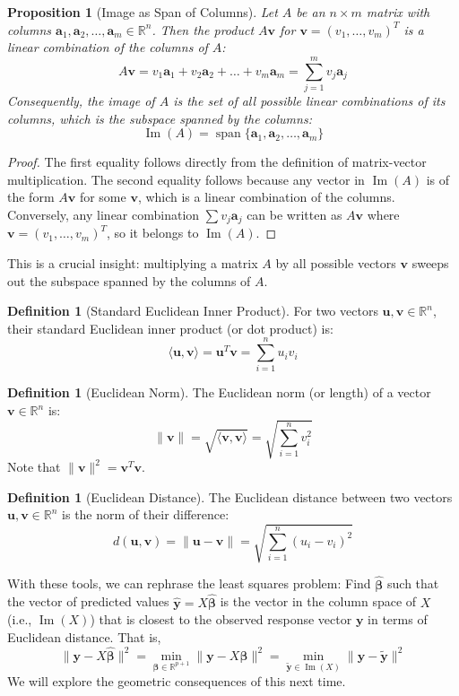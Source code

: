 \documentclass[11pt]{article}
\newtheorem{proposition}[theorem]{Proposition}
\theoremstyle{definition}
\newtheorem{definition}[theorem]{Definition}
\newcommand{\R}{\mathbb{R}}
\newcommand{\T}{^T} %
\DeclareMathOperator{\Image}{Im}
\DeclareMathOperator{\Span}{span}
\newcommand{\norm}[1]{\|#1\|}
\newcommand{\innerprod}[2]{\langle #1, #2 \rangle}
\begin{document}
\begin{proposition}[Image as Span of Columns]
Let $A$ be an $n \times m$ matrix with columns $\mathbf{a}_1, \mathbf{a}_2, \dots, \mathbf{a}_m \in \R^n$. Then the product $A\mathbf{v}$ for $\mathbf{v} = (v_1, \dots, v_m)\T$ is a linear combination of the columns of $A$:
\[ A\mathbf{v} = v_1 \mathbf{a}_1 + v_2 \mathbf{a}_2 + \dots + v_m \mathbf{a}_m = \sum_{j=1}^m v_j \mathbf{a}_j \]
Consequently, the image of $A$ is the set of all possible linear combinations of its columns, which is the subspace spanned by the columns:
\[ \Image(A) = \Span\{\mathbf{a}_1, \mathbf{a}_2, \dots, \mathbf{a}_m\} \]
\end{proposition}
\begin{proof}
The first equality follows directly from the definition of matrix-vector multiplication. The second equality follows because any vector in $\Image(A)$ is of the form $A\mathbf{v}$ for some $\mathbf{v}$, which is a linear combination of the columns. Conversely, any linear combination $\sum v_j \mathbf{a}_j$ can be written as $A\mathbf{v}$ where $\mathbf{v}=(v_1, \dots, v_m)\T$, so it belongs to $\Image(A)$.
\end{proof}
This is a crucial insight: multiplying a matrix $A$ by all possible vectors $\mathbf{v}$ sweeps out the subspace spanned by the columns of $A$.

\begin{definition}[Standard Euclidean Inner Product]
For two vectors $\mathbf{u}, \mathbf{v} \in \R^n$, their standard Euclidean inner product (or dot product) is:
\[ \innerprod{\mathbf{u}}{\mathbf{v}} = \mathbf{u}\T \mathbf{v} = \sum_{i=1}^n u_i v_i \]
\end{definition}

\begin{definition}[Euclidean Norm]
The Euclidean norm (or length) of a vector $\mathbf{v} \in \R^n$ is:
\[ \norm{\mathbf{v}} = \sqrt{\innerprod{\mathbf{v}}{\mathbf{v}}} = \sqrt{\sum_{i=1}^n v_i^2} \]
Note that $\norm{\mathbf{v}}^2 = \mathbf{v}\T \mathbf{v}$.
\end{definition}

\begin{definition}[Euclidean Distance]
The Euclidean distance between two vectors $\mathbf{u}, \mathbf{v} \in \R^n$ is the norm of their difference:
\[ d(\mathbf{u}, \mathbf{v}) = \norm{\mathbf{u} - \mathbf{v}} = \sqrt{\sum_{i=1}^n (u_i - v_i)^2} \]
\end{definition}

With these tools, we can rephrase the least squares problem: Find $\hat{\boldsymbol{\beta}}$ such that the vector of predicted values $\hat{\mathbf{y}} = X\hat{\boldsymbol{\beta}}$ is the vector in the column space of $X$ (i.e., $\Image(X)$) that is closest to the observed response vector $\mathbf{y}$ in terms of Euclidean distance. That is,
\[ \norm{\mathbf{y} - X\hat{\boldsymbol{\beta}}}^2 = \min_{\boldsymbol{\beta} \in \R^{p+1}} \norm{\mathbf{y} - X\boldsymbol{\beta}}^2 = \min_{\tilde{\mathbf{y}} \in \Image(X)} \norm{\mathbf{y} - \tilde{\mathbf{y}}}^2 \]
We will explore the geometric consequences of this next time.
\end{document}
